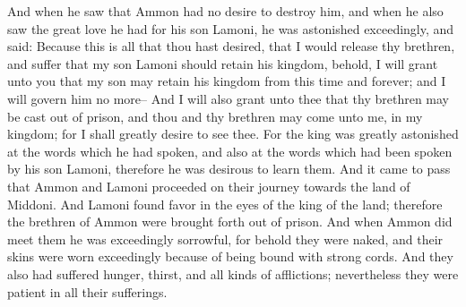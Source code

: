 \bverse \iffalse And when he saw that Ammon had no desire to destroy him, and when he also saw the great love he had for his son Lamoni, he was astonished exceedingly, and said: Because this is all that thou hast desired, that I would release thy brethren, and suffer that my son Lamoni should retain his kingdom, behold, I will grant unto you that my son may retain his kingdom from this time and forever; and I will govern him no more-- \fi
And when he saw that Ammon had no desire to destroy him, and when he also saw the great love he had for his son Lamoni, he was astonished exceedingly, and said: Because this is all that thou hast desired, that I would release thy brethren, and suffer that my son Lamoni should retain his kingdom, behold, I will grant unto you that my son may retain his kingdom from this time and forever; and I will govern him no more--
\bverse \iffalse And I will also grant unto thee that thy brethren may be cast out of prison, and thou and thy brethren may come unto me, in my kingdom; for I shall greatly desire to see thee. For the king was greatly astonished at the words which he had spoken, and also at the words which had been spoken by his son Lamoni, therefore he was desirous to learn them. \fi
And I will also grant unto thee that thy brethren may be cast out of prison, and thou and thy brethren may come unto me, in my kingdom; for I shall greatly desire to see thee. For the king was greatly astonished at the words which he had spoken, and also at the words which had been spoken by his son Lamoni, therefore he was desirous to learn them.
\bverse \iffalse And it came to pass that Ammon and Lamoni proceeded on their journey towards the land of Middoni. And Lamoni found favor in the eyes of the king of the land; therefore the brethren of Ammon were brought forth out of prison. \fi
And it came to pass that Ammon and Lamoni proceeded on their journey towards the land of Middoni. And Lamoni found favor in the eyes of the king of the land; therefore the brethren of Ammon were brought forth out of prison.
\bverse \iffalse And when Ammon did meet them he was exceedingly sorrowful, for behold they were naked, and their skins were worn exceedingly because of being bound with strong cords. And they also had suffered hunger, thirst, and all kinds of afflictions; nevertheless they were patient in all their sufferings. \fi
And when Ammon did meet them he was exceedingly sorrowful, for behold they were naked, and their skins were worn exceedingly because of being bound with strong cords. And they also had suffered hunger, thirst, and all kinds of afflictions; nevertheless they were patient in all their sufferings.
